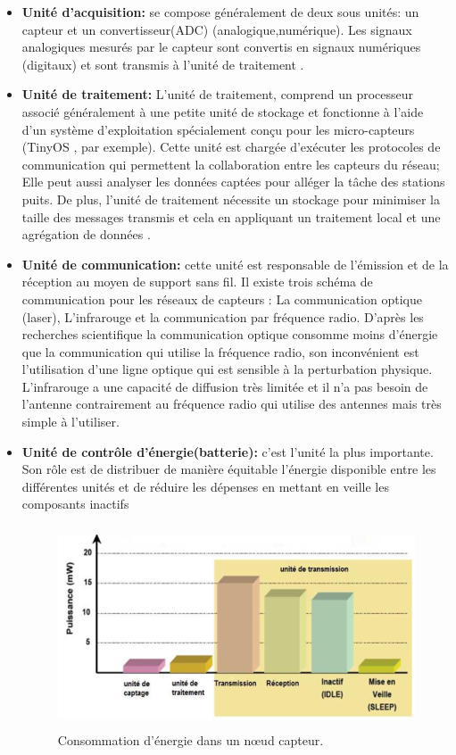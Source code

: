 \begin{itemize}
  \item \textbf{Unité d’acquisition: }se compose généralement de deux sous unités: un capteur et un convertisseur(ADC) (analogique,numérique).
Les signaux analogiques mesurés par le capteur sont convertis en signaux numériques (digitaux) et sont transmis à l’unité de traitement \cite{mekidicheetude}.
 
  \item \textbf{Unité de traitement: }L’unité de traitement, comprend un processeur associé généralement à une petite unité de stockage et fonctionne à l’aide d’un système d’exploitation spécialement conçu pour les micro-capteurs (TinyOS \cite{hill2000system}, par exemple). Cette unité est chargée d’exécuter les protocoles de communication qui permettent la collaboration entre les capteurs du réseau; Elle peut aussi analyser les données captées pour alléger la tâche des stations puits. De plus, l’unité de traitement nécessite un stockage pour minimiser la taille des messages transmis et cela en appliquant un traitement local et une agrégation de données \cite{feng2002system}.
	\item \textbf{Unité de communication: }cette unité est responsable de l’émission et de la réception au moyen de support sans fil. Il existe trois schéma de communication pour les réseaux de capteurs : La communication optique (laser), L’infrarouge et la communication par fréquence radio. D’après les recherches scientifique la communication optique consomme moins d’énergie que la communication qui utilise la fréquence radio, son inconvénient est l’utilisation  d’une ligne optique qui est sensible à la perturbation physique. L’infrarouge a une capacité de diffusion très limitée et il n’a pas besoin de l’antenne contrairement au fréquence radio qui utilise des antennes mais très simple à l’utiliser.
	\item \textbf{Unité de contrôle d’énergie(batterie): }c’est l’unité la plus importante. Son rôle est de distribuer de manière équitable l'énergie disponible entre les différentes unités et de réduire les dépenses en mettant en veille les composants inactifs
\begin{figure}[h]
	\centering
	\includegraphics[width=14cm,height=6cm]{Chap1/4.png}
	\caption{Consommation d’énergie dans un nœud capteur. \cite{raghunathan2005design,karl2007protocols}}
	\label{fig:CENC}
\end{figure}
\end{itemize}

